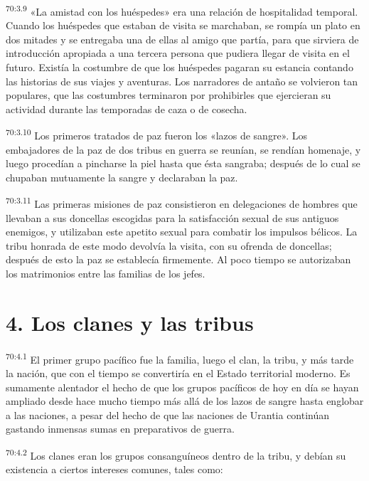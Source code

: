 \par
\textsuperscript{70:3.9} «La amistad con los huéspedes» era una relación de hospitalidad temporal. Cuando los huéspedes que estaban de visita se marchaban, se rompía un plato en dos mitades y se entregaba una de ellas al amigo que partía, para que sirviera de introducción apropiada a una tercera persona que pudiera llegar de visita en el futuro. Existía la costumbre de que los huéspedes pagaran su estancia contando las historias de sus viajes y aventuras. Los narradores de antaño se volvieron tan populares, que las costumbres terminaron por prohibirles que ejercieran su actividad durante las temporadas de caza o de cosecha.

\par
\textsuperscript{70:3.10} Los primeros tratados de paz fueron los «lazos de sangre». Los embajadores de la paz de dos tribus en guerra se reunían, se rendían homenaje, y luego procedían a pincharse la piel hasta que ésta sangraba; después de lo cual se chupaban mutuamente la sangre y declaraban la paz.

\par
\textsuperscript{70:3.11} Las primeras misiones de paz consistieron en delegaciones de hombres que llevaban a sus doncellas escogidas para la satisfacción sexual de sus antiguos enemigos, y utilizaban este apetito sexual para combatir los impulsos bélicos. La tribu honrada de este modo devolvía la visita, con su ofrenda de doncellas; después de esto la paz se establecía firmemente. Al poco tiempo se autorizaban los matrimonios entre las familias de los jefes.

\section*{4. Los clanes y las tribus}
\par
\textsuperscript{70:4.1} El primer grupo pacífico fue la familia, luego el clan, la tribu, y más tarde la nación, que con el tiempo se convertiría en el Estado territorial moderno. Es sumamente alentador el hecho de que los grupos pacíficos de hoy en día se hayan ampliado desde hace mucho tiempo más allá de los lazos de sangre hasta englobar a las naciones, a pesar del hecho de que las naciones de Urantia continúan gastando inmensas sumas en preparativos de guerra.

\par
\textsuperscript{70:4.2} Los clanes eran los grupos consanguíneos dentro de la tribu, y debían su existencia a ciertos intereses comunes, tales como:

